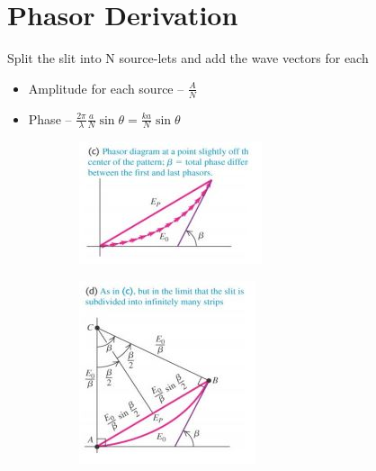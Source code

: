 \documentclass[a4paper, 11pt, normalem]{report}
\begin{document}
\section{Phasor Derivation}
Split the slit into N source-lets and add the wave vectors for each
\begin{itemize}
    \item Amplitude for each source -- $\frac{A}{N}$
    \item Phase -- $\frac{2\pi}{\lambda}\frac{a}{N}\sin{\theta} = \frac{ka}{N}\sin{\theta}$
\end{itemize}
\begin{figure}[H]
    \centering
    \begin{subfigure}{0.4\textwidth}
        \includegraphics[width=\textwidth]{Phas1.jpg}
    \end{subfigure}
    \begin{subfigure}{0.4\textwidth}
        \includegraphics[width=\textwidth]{Phas2.jpg}
    \end{subfigure}
\end{figure}
\end{document}
